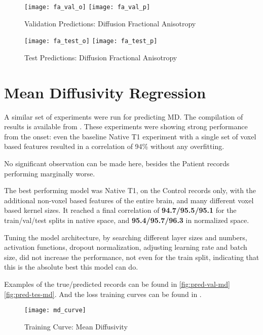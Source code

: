 \begin{figure}[H]
\centering
\texttt{[image: fa\_val\_o]}
\texttt{[image: fa\_val\_p]}
\caption{Validation Predictions: Diffusion Fractional Anisotropy}
\label{fig:pred-val-fa}
\end{figure}

\begin{figure}[H]
\centering
\texttt{[image: fa\_test\_o]}
\texttt{[image: fa\_test\_p]}
\caption{Test Predictions: Diffusion Fractional Anisotropy}
\label{fig:pred-tes-fa}
\end{figure}

\section{Mean Diffusivity Regression}

A similar set of experiments were run for predicting \ac{MD}. The compilation of results is available from  . These experiments were showing strong performance from the onset: even the baseline Native T1 experiment with a single set of voxel based features resulted in a correlation of 94\% without any overfitting.\par
No significant observation can be made here, besides the Patient records performing marginally worse.\par
The best performing model was Native T1, on the Control records only, with the additional non-voxel based features of the entire brain, and many different voxel based kernel sizes. It reached a final correlation of \textbf{94.7/95.5/95.1} for the train/val/test splits in native space, and \textbf{95.4/95.7/96.3} in normalized space.\par
Tuning the model architecture, by searching different layer sizes and numbers, activation functions, dropout normalization, adjusting learning rate and batch size, did not increase the performance, not even for the train split, indicating that this is the absolute best this model can do.\par
Examples of the true/predicted records can be found in  \ref{fig:pred-val-md} \ref{fig:pred-tes-md}. And the loss training curves can be found in .

\begin{figure}[H]
\centering
\texttt{[image: md\_curve]}
\caption{Training Curve: Mean Diffusivity}
\label{fig:curve-md}
\end{figure}

